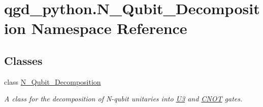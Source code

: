 \hypertarget{namespaceqgd__python_1_1_n___qubit___decomposition}{}\section{qgd\+\_\+python.\+N\+\_\+\+Qubit\+\_\+\+Decomposition Namespace Reference}
\label{namespaceqgd__python_1_1_n___qubit___decomposition}
\subsection*{Classes}
\begin{DoxyCompactItemize}
\item 
class \hyperlink{classqgd__python_1_1_n___qubit___decomposition_1_1_n___qubit___decomposition}{N\+\_\+\+Qubit\+\_\+\+Decomposition}
\begin{DoxyCompactList}\small\item\em A class for the decomposition of N-\/qubit unitaries into \hyperlink{class_u3}{U3} and \hyperlink{class_c_n_o_t}{C\+N\+OT} gates. \end{DoxyCompactList}\end{DoxyCompactItemize}
